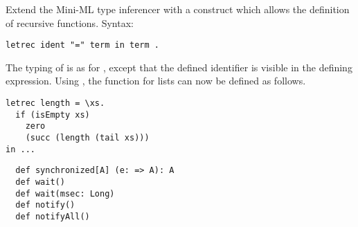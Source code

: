 \begin{exercise}\label{execcise:hm-extend} Extend the Mini-ML  type
inferencer with a  construct which allows the definition of
recursive functions. Syntax:
\begin{lstlisting}
letrec ident "=" term in term .
\end{lstlisting}
The typing of  is as for , 
except that the defined identifier is visible in the defining expression. Using , the  function for lists can now be defined as follows.
\begin{lstlisting}
letrec length = \xs.
  if (isEmpty xs)
    zero
    (succ (length (tail xs)))
in ...
\end{lstlisting}
\end{exercise}




\begin{lstlisting}
  def synchronized[A] (e: => A): A
  def wait()
  def wait(msec: Long)
  def notify()
  def notifyAll()
\end{lstlisting}



